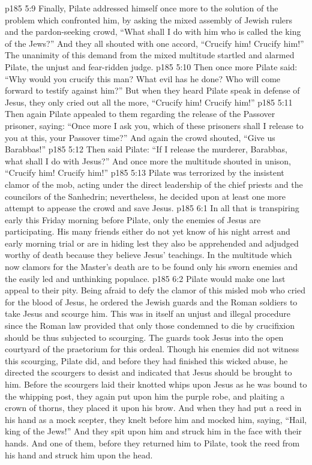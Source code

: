 \vs p185 5:9 Finally, Pilate addressed himself once more to the solution of the problem which confronted him, by asking the mixed assembly of Jewish rulers and the pardon\hyp{}seeking crowd, “What shall I do with him who is called the king of the Jews?” And they all shouted with one accord, “Crucify him! Crucify him!” The unanimity of this demand from the mixed multitude startled and alarmed Pilate, the unjust and fear\hyp{}ridden judge.
\vs p185 5:10 Then once more Pilate said: “Why would you crucify this man? What evil has he done? Who will come forward to testify against him?” But when they heard Pilate speak in defense of Jesus, they only cried out all the more, “Crucify him! Crucify him!”
\vs p185 5:11 Then again Pilate appealed to them regarding the release of the Passover prisoner, saying: “Once more I ask you, which of these prisoners shall I release to you at this, your Passover time?” And again the crowd shouted, “Give us Barabbas!”
\vs p185 5:12 Then said Pilate: “If I release the murderer, Barabbas, what shall I do with Jesus?” And once more the multitude shouted in unison, “Crucify him! Crucify him!”
\vs p185 5:13 Pilate was terrorized by the insistent clamor of the mob, acting under the direct leadership of the chief priests and the councilors of the Sanhedrin; nevertheless, he decided upon at least one more attempt to appease the crowd and save Jesus.
\vs p185 6:1 In all that is transpiring early this Friday morning before Pilate, only the enemies of Jesus are participating. His many friends either do not yet know of his night arrest and early morning trial or are in hiding lest they also be apprehended and adjudged worthy of death because they believe Jesus’ teachings. In the multitude which now clamors for the Master’s death are to be found only his sworn enemies and the easily led and unthinking populace.
\vs p185 6:2 Pilate would make one last appeal to their pity. Being afraid to defy the clamor of this misled mob who cried for the blood of Jesus, he ordered the Jewish guards and the Roman soldiers to take Jesus and scourge him. This was in itself an unjust and illegal procedure since the Roman law provided that only those condemned to die by crucifixion should be thus subjected to scourging. The guards took Jesus into the open courtyard of the praetorium for this ordeal. Though his enemies did not witness this scourging, Pilate did, and before they had finished this wicked abuse, he directed the scourgers to desist and indicated that Jesus should be brought to him. Before the scourgers laid their knotted whips upon Jesus as he was bound to the whipping post, they again put upon him the purple robe, and plaiting a crown of thorns, they placed it upon his brow. And when they had put a reed in his hand as a mock scepter, they knelt before him and mocked him, saying, “Hail, king of the Jews!” And they spit upon him and struck him in the face with their hands. And one of them, before they returned him to Pilate, took the reed from his hand and struck him upon the head.
